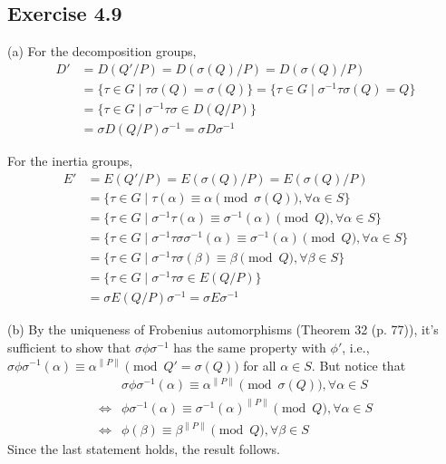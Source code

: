 \documentclass[../Marcus.tex]{subfiles}
\begin{document}
\subsection*{Exercise 4.9}

(a) For the decomposition groups,
\begin{align*}
    D' &= D(Q'/P) = D(\sigma(Q)/P) = D(\sigma(Q)/P) \\
	&= \{\tau\in G\mid \tau\sigma(Q)=\sigma(Q)\} = \{\tau\in G\mid \sigma^{-1}\tau\sigma(Q)=Q\} \\
    &= \{\tau\in G\mid \sigma^{-1}\tau\sigma \in D(Q/P)\}   \\
	&= \sigma D(Q/P) \sigma^{-1} = \sigma D\sigma^{-1}
\end{align*}

For the inertia groups,
\begin{align*}
    E' &= E(Q'/P) = E(\sigma(Q)/P) = E(\sigma(Q)/P) \\
	&= \{\tau\in G \mid \tau(\alpha) \equiv \alpha \pmod{\sigma(Q)}, \forall\alpha\in S\} \\
	&= \{\tau\in G \mid \sigma^{-1}\tau(\alpha) \equiv \sigma^{-1}(\alpha) \pmod{Q}, \forall\alpha\in S\} \\
    &= \{\tau\in G \mid \sigma^{-1}\tau\sigma\sigma^{-1}(\alpha) \equiv \sigma^{-1}(\alpha) \pmod{Q}, \forall\alpha\in S\} \\
    &= \{\tau\in G\mid \sigma^{-1}\tau\sigma(\beta) \equiv \beta \pmod{Q}, \forall\beta\in S\} \\
    &= \{\tau\in G\mid \sigma^{-1}\tau\sigma\in E(Q/P)\} \\
    &= \sigma E(Q/P)\sigma^{-1} = \sigma E\sigma^{-1}
\end{align*}

(b) By the uniqueness of Frobenius automorphisms (Theorem 32 (p. 77)), it's sufficient to show that $\sigma\phi\sigma^{-1}$ has the same property with $\phi'$, i.e., $\sigma\phi\sigma^{-1}(\alpha)\equiv\alpha^{\|P\|} \pmod{Q'=\sigma(Q)}$ for all $\alpha\in S$. But notice that
\begin{align*}
    &\sigma\phi\sigma^{-1}(\alpha)\equiv\alpha^{\|P\|} \pmod{\sigma(Q)}, \forall\alpha\in S \\
    \iff{} &\phi\sigma^{-1}(\alpha) \equiv \sigma^{-1}(\alpha)^{\|P\|} \pmod{Q}, \forall\alpha\in S \\
    \iff{} &\phi(\beta) \equiv \beta^{\|P\|} \pmod{Q}, \forall\beta\in S
\end{align*}
Since the last statement holds, the result follows.
\end{document}
